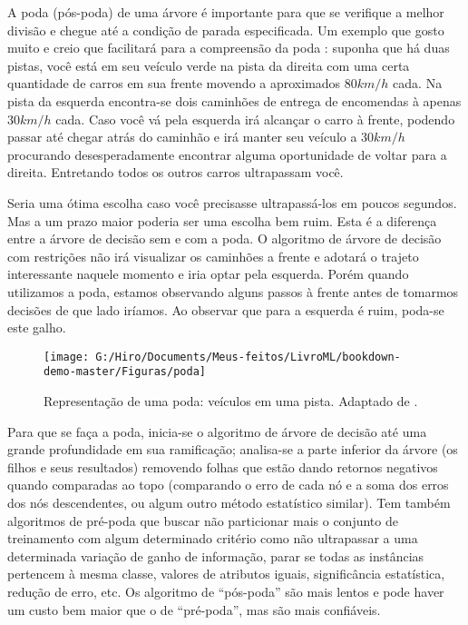 \documentclass[
  openany]{book}
\begin{document}
A poda (pós-poda) de uma árvore é importante para que se verifique a melhor divisão e chegue até a condição de parada especificada. Um exemplo que gosto muito e creio que facilitará para a compreensão da poda \citep{analytics} : suponha que há duas pistas, você está em seu veículo verde na pista da direita com uma certa quantidade de carros em sua frente movendo a aproximados 80\(km/h\) cada. Na pista da esquerda encontra-se dois caminhões de entrega de encomendas à apenas 30\(km/h\) cada. Caso você vá pela esquerda irá alcançar o carro à frente, podendo passar até chegar atrás do caminhão e irá manter seu veículo a 30\(km/h\) procurando desesperadamente encontrar alguma oportunidade de voltar para a direita. Entretando todos os outros carros ultrapassam você.

Seria uma ótima escolha caso você precisasse ultrapassá-los em poucos segundos. Mas a um prazo maior poderia ser uma escolha bem ruim. Esta é a diferença entre a árvore de decisão sem e com a poda. O algoritmo de árvore de decisão com restrições não irá visualizar os caminhões a frente e adotará o trajeto interessante naquele momento e iria optar pela esquerda. Porém quando utilizamos a poda, estamos observando alguns passos à frente antes de tomarmos decisões de que lado iríamos. Ao observar que para a esquerda é ruim, poda-se este galho.

\begin{figure}

{\centering \texttt{[image: G:/Hiro/Documents/Meus-feitos/LivroML/bookdown-demo-master/Figuras/poda]} 

}

\caption{Representação de uma poda: veículos em uma pista. Adaptado de \citep{analytics}.}\label{fig:poda}
\end{figure}



Para que se faça a poda, inicia-se o algoritmo de árvore de decisão até uma grande profundidade em sua ramificação; analisa-se a parte inferior da árvore (os filhos e seus resultados) removendo folhas que estão dando retornos negativos quando comparadas ao topo (comparando o erro de cada nó e a soma dos erros dos nós descendentes, ou algum outro método estatístico similar). Tem também algoritmos de pré-poda que buscar não particionar mais o conjunto de treinamento com algum determinado critério como não ultrapassar a uma determinada variação de ganho de informação, parar se todas as instâncias pertencem à mesma classe, valores de atributos iguais, significância estatística, redução de erro, etc. Os algoritmo de ``pós-poda'' são mais lentos e pode haver um custo bem maior que o de ``pré-poda'', mas são mais confiáveis.
\end{document}
